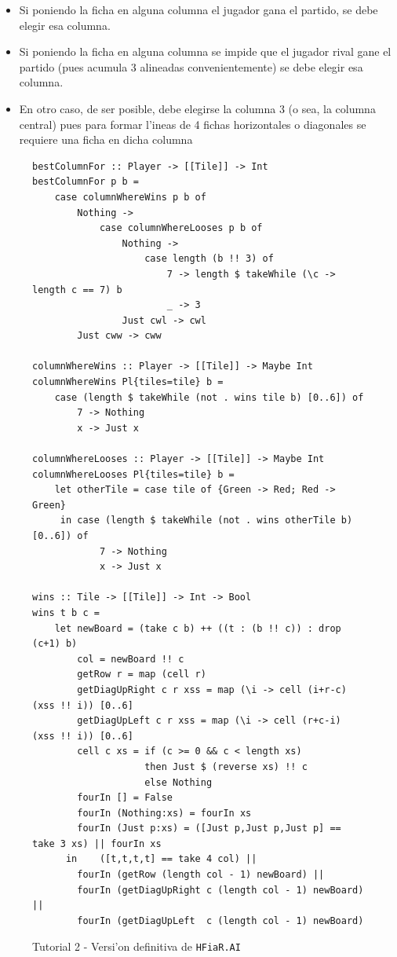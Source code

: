 \documentclass[a4paper]{article}
\begin{document}
\begin{itemize}
	\item Si poniendo la ficha en alguna columna el jugador gana el partido, se debe elegir esa columna.
	\item Si poniendo la ficha en alguna columna se impide que el jugador rival gane el partido (pues acumula 3 alineadas convenientemente) se debe elegir esa columna.
	\item En otro caso, de ser posible, debe elegirse la columna 3 (o sea, la columna central) pues para formar l'ineas de 4 fichas horizontales o diagonales se requiere una ficha en dicha columna
\end{itemize}
\begin{figure}[hp]
	\begin{center}
		\begin{lstlisting}
bestColumnFor :: Player -> [[Tile]] -> Int
bestColumnFor p b =
	case columnWhereWins p b of
		Nothing ->
			case columnWhereLooses p b of
				Nothing ->
					case length (b !! 3) of
						7 -> length $ takeWhile (\c -> length c == 7) b
						_ -> 3
				Just cwl -> cwl
		Just cww -> cww

columnWhereWins :: Player -> [[Tile]] -> Maybe Int
columnWhereWins Pl{tiles=tile} b =
	case (length $ takeWhile (not . wins tile b) [0..6]) of
		7 -> Nothing
		x -> Just x

columnWhereLooses :: Player -> [[Tile]] -> Maybe Int
columnWhereLooses Pl{tiles=tile} b =
	let otherTile = case tile of {Green -> Red; Red -> Green}
	 in case (length $ takeWhile (not . wins otherTile b) [0..6]) of
			7 -> Nothing
			x -> Just x

wins :: Tile -> [[Tile]] -> Int -> Bool
wins t b c =
	let	newBoard = (take c b) ++ ((t : (b !! c)) : drop (c+1) b)
		col = newBoard !! c
		getRow r = map (cell r)
		getDiagUpRight c r xss = map (\i -> cell (i+r-c) (xss !! i)) [0..6]
		getDiagUpLeft c r xss = map (\i -> cell (r+c-i) (xss !! i)) [0..6]
		cell c xs = if (c >= 0 && c < length xs)
					then Just $ (reverse xs) !! c
					else Nothing
		fourIn [] = False
		fourIn (Nothing:xs) = fourIn xs
		fourIn (Just p:xs) = ([Just p,Just p,Just p] == take 3 xs) || fourIn xs
      in	([t,t,t,t] == take 4 col) ||
      	fourIn (getRow (length col - 1) newBoard) ||
		fourIn (getDiagUpRight c (length col - 1) newBoard) ||
		fourIn (getDiagUpLeft  c (length col - 1) newBoard)
		\end{lstlisting}
		\caption{Tutorial 2 - Versi'on definitiva de \texttt{HFiaR.AI}}
		\label{tut209}
	\end{center}
\end{figure}
\end{document}
